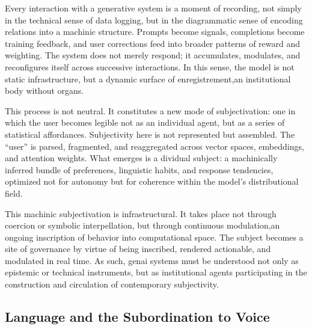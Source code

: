 Every interaction with a generative system is a moment of recording, not simply in the technical sense of data logging, but in the diagrammatic sense of encoding relations into a machinic structure. Prompts become signals, completions become training feedback, and user corrections feed into broader patterns of reward and weighting. The system does not merely respond; it accumulates, modulates, and reconfigures itself across successive interactions. In this sense, the model is not static infrastructure, but a dynamic surface of enregistrement,an institutional body without organs.

This process is not neutral. It constitutes a new mode of subjectivation: one in which the user becomes legible not as an individual agent, but as a series of statistical affordances. Subjectivity here is not represented but assembled. The “user” is parsed, fragmented, and reaggregated across vector spaces, embeddings, and attention weights. What emerges is a dividual subject: a machinically inferred bundle of preferences, linguistic habits, and response tendencies, optimized not for autonomy but for coherence within the model's distributional field.

This machinic subjectivation is infrastructural. It takes place not through coercion or symbolic interpellation, but through continuous modulation,an ongoing inscription of behavior into computational space. The subject becomes a site of governance by virtue of being inscribed, rendered actionable, and modulated in real time. As such, \gls{genai} systems must be understood not only as epistemic or technical instruments, but as institutional agents participating in the construction and circulation of contemporary subjectivity.

\subsection{Language and the Subordination to Voice}

